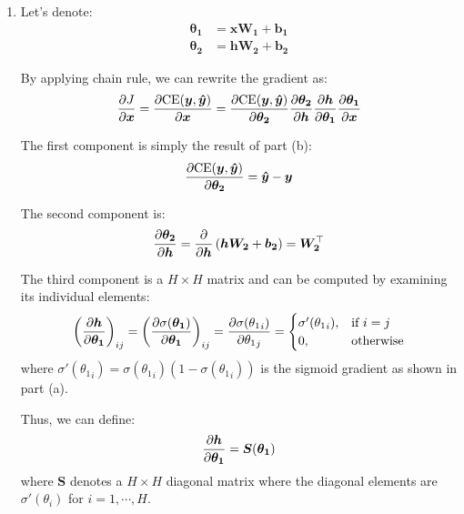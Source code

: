 \documentclass[10pt,reqno]{amsart}
\begin{document}
\begin{enumerate}[topsep=0pt,itemsep=2ex,partopsep=1ex,parsep=1ex]
\begin{enumerate}
  \item
    Let's denote:
    \begin{align*}
      \bm{\theta_1} &= \bm{x W_1} + \bm{b_1} \\
      \bm{\theta_2} &= \bm{h W_2} + \bm{b_2}
    \end{align*}
    
    By applying chain rule, we can rewrite the gradient as:
    \begin{equation*}
      \frac{\partial J}{\partial \bm{x}}
      = \frac{\partial \text{CE}(\bm{y}, \bm{\hat{y}})}{\partial \bm{x}}
      = \frac{\partial \text{CE}(\bm{y}, \bm{\hat{y}})}{\partial \bm{\theta_2}} \frac{\partial \bm{\theta_2}}{\partial \bm{h}} \frac{\partial \bm{h}}{\partial \bm{\theta_1}} \frac{\partial \bm{\theta_1}}{\partial \bm{x}}
    \end{equation*}
    
    The first component is simply the result of part (b):
    \begin{equation*}
      \frac{\partial \text{CE}(\bm{y}, \bm{\hat{y}})}{\partial \bm{\theta_2}} = \bm{\hat{y}} - \bm{y}
    \end{equation*}
    
    The second component is:
    \begin{equation*}
      \frac{\partial \bm{\theta_2}}{\partial \bm{h}} = \frac{\partial}{\partial \bm{h}} \left( \bm{h W_2} + \bm{b_2} \right) = \bm{W_2}^\top
    \end{equation*}

    The third component is a $H \times H$ matrix
    and can be computed by examining its individual elements:
    \begin{equation*}
      \left( \frac{\partial \bm{h}}{\partial \bm{\theta_1}} \right)_{ij}
      = \left( \frac{\partial \sigma(\bm{\theta_1})}{\partial \bm{\theta_1}} \right)_{ij} 
      = \frac{\partial \sigma({\theta_1}_i)}{\partial {\theta_1}_j} = 
      \begin{cases}
        \sigma'({\theta_1}_i), & \text{if}\ i=j \\
        0, & \text{otherwise}
      \end{cases}
    \end{equation*}
    where $\sigma'({\theta_1}_i) = \sigma({\theta_1}_i) \left( 1 - \sigma({\theta_1}_i) \right)$
    is the sigmoid gradient as shown in part (a).

    Thus, we can define: 
    \begin{equation*}
      \frac{\partial \bm{h}}{\partial \bm{\theta_1}} = \bm{S}(\bm{\theta_1})
    \end{equation*}
    where $\bm{S}$ denotes a $H \times H$ diagonal matrix where 
    the diagonal elements are $\sigma'(\theta_i)$ for $i = 1, \cdots, H$.


\end{enumerate}
\end{enumerate}
\end{document}
